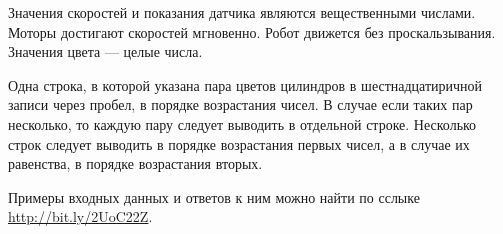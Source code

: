 Значения скоростей и показания датчика являются вещественными числами. Моторы достигают скоростей мгновенно. Робот движется без проскальзывания.
Значения цвета --- целые числа.


\outputfmtSection

Одна строка, в которой указана пара цветов цилиндров в шестнадцатиричной записи через пробел, в порядке возрастания чисел.
В случае если таких пар несколько, то каждую пару следует выводить в отдельной строке.
Несколько строк следует выводить в порядке возрастания первых чисел, а в случае их равенства, в порядке возрастания вторых.


\exampleSection

Примеры входных данных и ответов к ним можно найти по сслыке \url{http://bit.ly/2UoC22Z}.



